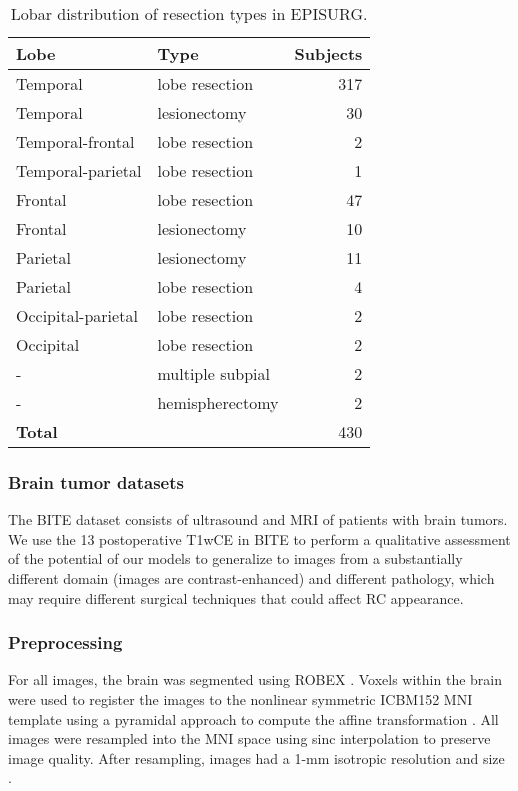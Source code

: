 \begin{table}
  \centering
  \caption{
    Lobar distribution of resection types in EPISURG.
  }
  \label{tab:episurg}
  \begin{tabular}{llr}
    \toprule
    \textbf{Lobe}      & \textbf{Type}    & \textbf{Subjects} \\
    \midrule
    Temporal           & lobe resection   &        317 \\
    Temporal           & lesionectomy     &         30 \\
    Temporal-frontal   & lobe resection   &          2 \\
    Temporal-parietal  & lobe resection   &          1 \\
    Frontal            & lobe resection   &         47 \\
    Frontal            & lesionectomy     &         10 \\
    Parietal           & lesionectomy     &         11 \\
    Parietal           & lobe resection   &          4 \\
    Occipital-parietal & lobe resection   &          2 \\
    Occipital          & lobe resection   &          2 \\
    -                  & multiple subpial &          2 \\
    -                  & hemispherectomy  &          2 \\
    \midrule
    \textbf{Total}     &                  &        430 \\
    \bottomrule
  \end{tabular}
\end{table}



\subsubsection{Brain tumor datasets}

The \ac{BITE} dataset \cite{mercier_online_2012} consists of ultrasound and \ac{MRI} of patients with brain tumors.
We use the 13 postoperative \ac{T1wCE} in \ac{BITE} to perform a qualitative assessment of the potential of our models to generalize to images from a substantially different domain (images are contrast-enhanced) and different pathology, which may require different surgical techniques that could affect \ac{RC} appearance.



\subsubsection{Preprocessing}
\label{sec:preprocessing}

For all images, the brain was segmented using ROBEX \cite{iglesias_robust_2011}.
Voxels within the brain were used to register the images to the nonlinear symmetric ICBM152 \ac{MNI} template \cite{fonov_unbiased_2009,fonov_unbiased_2011} using a pyramidal approach to compute the affine transformation \cite{modat_global_2014}.
All images were resampled into the \ac{MNI} space using sinc interpolation to preserve image quality.
After resampling, images had a 1-mm isotropic resolution and size .
